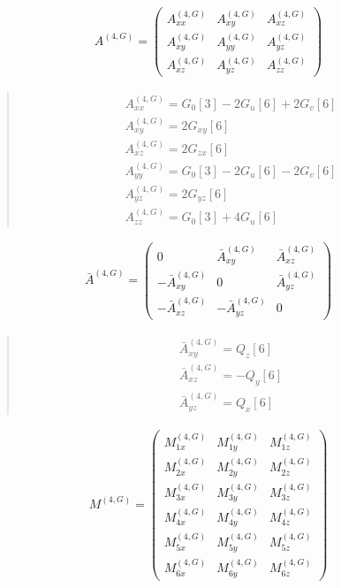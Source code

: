 \documentclass[fleqn,10pt]{jsarticle}
\begin{document}
\begin{align*}
A^{(4,G)} = \begin{pmatrix} A^{(4,G)}_{xx} & A^{(4,G)}_{xy} & A^{(4,G)}_{xz} \\ A^{(4,G)}_{xy} & A^{(4,G)}_{yy} & A^{(4,G)}_{yz} \\ A^{(4,G)}_{xz} & A^{(4,G)}_{yz} & A^{(4,G)}_{zz} \end{pmatrix}
\end{align*}
\begin{quote}
\begin{align*}
& A^{(4,G)}_{xx} = G_{0}[3] - 2 G_{u}[6] + 2 G_{v}[6] \\
& A^{(4,G)}_{xy} = 2 G_{xy}[6] \\
& A^{(4,G)}_{xz} = 2 G_{zx}[6] \\
& A^{(4,G)}_{yy} = G_{0}[3] - 2 G_{u}[6] - 2 G_{v}[6] \\
& A^{(4,G)}_{yz} = 2 G_{yz}[6] \\
& A^{(4,G)}_{zz} = G_{0}[3] + 4 G_{u}[6]
\end{align*}
\end{quote}
\begin{align*}
\bar{A}^{(4,G)} = \begin{pmatrix} 0 & \bar{A}^{(4,G)}_{xy} & \bar{A}^{(4,G)}_{xz} \\ - \bar{A}^{(4,G)}_{xy} & 0 & \bar{A}^{(4,G)}_{yz} \\ - \bar{A}^{(4,G)}_{xz} & - \bar{A}^{(4,G)}_{yz} & 0 \end{pmatrix}
\end{align*}
\begin{quote}
\begin{align*}
& \bar{A}^{(4,G)}_{xy} = Q_{z}[6] \\
& \bar{A}^{(4,G)}_{xz} = - Q_{y}[6] \\
& \bar{A}^{(4,G)}_{yz} = Q_{x}[6]
\end{align*}
\end{quote}
\begin{align*}
M^{(4,G)} = \begin{pmatrix} M^{(4,G)}_{1x} & M^{(4,G)}_{1y} & M^{(4,G)}_{1z} \\ M^{(4,G)}_{2x} & M^{(4,G)}_{2y} & M^{(4,G)}_{2z} \\ M^{(4,G)}_{3x} & M^{(4,G)}_{3y} & M^{(4,G)}_{3z} \\ M^{(4,G)}_{4x} & M^{(4,G)}_{4y} & M^{(4,G)}_{4z} \\ M^{(4,G)}_{5x} & M^{(4,G)}_{5y} & M^{(4,G)}_{5z} \\ M^{(4,G)}_{6x} & M^{(4,G)}_{6y} & M^{(4,G)}_{6z} \end{pmatrix}
\end{align*}
\end{document}
